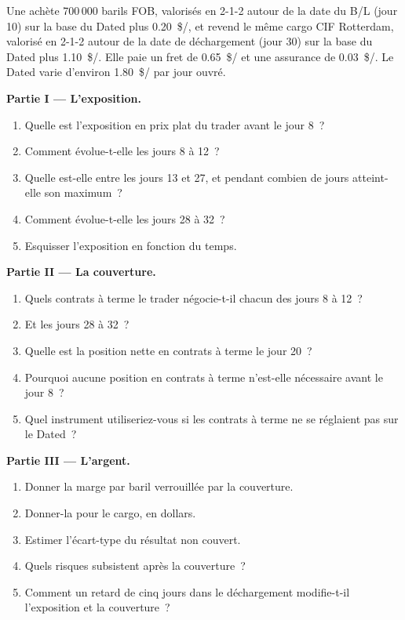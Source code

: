 \begin{problem}\label{pb:m3:physical-commodity-markets:1}
Une  achète 700\,000 barils FOB, valorisés en 2-1-2 autour de la date du B/L (jour
10) sur la base du Dated plus \qty{0.20}{\$/\barrel}, et revend le même cargo CIF Rotterdam,
valorisé en 2-1-2 autour de la date de déchargement (jour 30) sur la base du Dated plus
\qty{1.10}{\$/\barrel}. Elle paie un fret de \qty{0.65}{\$/\barrel} et une assurance de
\qty{0.03}{\$/\barrel}. Le Dated varie d'environ \qty{1.80}{\$/\barrel} par jour ouvré.

\medskip\noindent\textbf{Partie I --- L'exposition.}
\begin{enumerate}
\item Quelle est l'exposition en prix plat du trader avant le jour 8~?
\item Comment évolue-t-elle les jours 8 à 12~?
\item Quelle est-elle entre les jours 13 et 27, et pendant combien de jours atteint-elle son maximum~?
\item Comment évolue-t-elle les jours 28 à 32~?
\item Esquisser l'exposition en fonction du temps.
\end{enumerate}

\medskip\noindent\textbf{Partie II --- La couverture.}
\begin{enumerate}[resume]
\item Quels contrats à terme le trader négocie-t-il chacun des jours 8 à 12~?
\item Et les jours 28 à 32~?
\item Quelle est la position nette en contrats à terme le jour 20~?
\item Pourquoi aucune position en contrats à terme n'est-elle nécessaire avant le jour 8~?
\item Quel instrument utiliseriez-vous si les contrats à terme ne se réglaient pas sur le Dated~?
\end{enumerate}

\medskip\noindent\textbf{Partie III --- L'argent.}
\begin{enumerate}[resume]
\item Donner la marge par baril verrouillée par la couverture.
\item Donner-la pour le cargo, en dollars.
\item Estimer l'écart-type du résultat non couvert.
\item Quels risques subsistent après la couverture~?
\item Comment un retard de cinq jours dans le déchargement modifie-t-il l'exposition et la couverture~?
\end{enumerate}


\end{problem}
